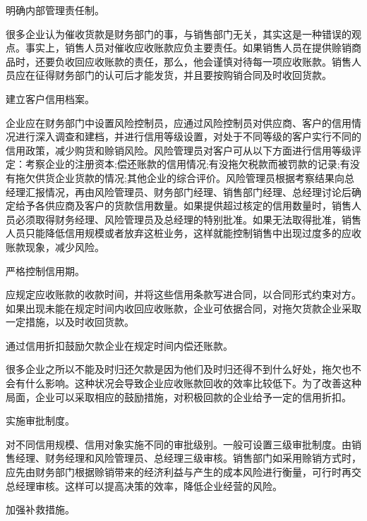     \begin{enumerate.zh}
        \item  明确内部管理责任制。

        很多企业认为催收货款是财务部门的事，与销售部门无关，其实这是一种错误的观点。事实上，销售人员对催收应收账款应负主要责任。如果销售人员在提供赊销商品时，还要负收回应收账款的责任，那么，他会谨慎对待每一项应收账款。销售人员应在征得财务部门的认可后才能发货，并且要按购销合同及时收回货款。

        \item  建立客户信用档案。

        企业应在财务部门中设置风险控制员，应通过风险控制员对供应商、客户的信用情况进行深入调查和建档，并进行信用等级设置，对处于不同等级的客户实行不同的信用政策，减少购货和赊销风险。风险管理员对客户可从以下方面进行信用等级评定：考察企业的注册资本;偿还账款的信用情况;有没拖欠税款而被罚款的记录;有没有拖欠供货企业货款的情况;其他企业的综合评价。风险管理员根据考察结果向总经理汇报情况，再由风险管理员、财务部门经理、销售部门经理、总经理讨论后确定给予各供应商及客户的货款信用数量。如果提供超过核定的信用数量时，销售人员必须取得财务经理、风险管理员及总经理的特别批准。如果无法取得批准，销售人员只能降低信用规模或者放弃这桩业务，这样就能控制销售中出现过度多的应收账款现象，减少风险。

        \item  严格控制信用期。

        应规定应收账款的收款时间，并将这些信用条款写进合同，以合同形式约束对方。如果出现未能在规定时间内收回应收账款，企业可依据合同，对拖欠货款企业采取一定措施，以及时收回货款。

        \item  通过信用折扣鼓励欠款企业在规定时间内偿还账款。

        很多企业之所以不能及时归还欠款是因为他们及时归还得不到什么好处，拖欠也不会有什么影响。这种状况会导致企业应收账款回收的效率比较低下。为了改善这种局面，企业可以采取相应的鼓励措施，对积极回款的企业给予一定的信用折扣。

        \item  实施审批制度。

        对不同信用规模、信用对象实施不同的审批级别。一般可设置三级审批制度。由销售经理、财务经理和风险管理员、总经理三级审核。销售部门如采用赊销方式时，应先由财务部门根据赊销带来的经济利益与产生的成本风险进行衡量，可行时再交总经理审核。这样可以提高决策的效率，降低企业经营的风险。

        \item  加强补救措施。


\end{enumerate.zh}
